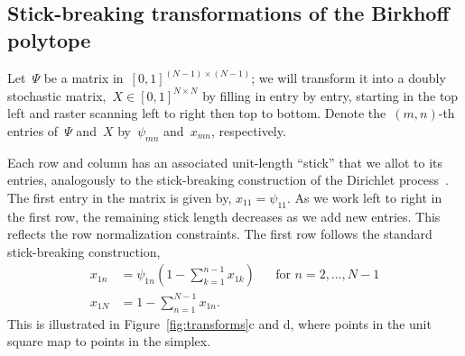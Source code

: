 \documentclass[twoside]{article}
\begin{document}
\subsection{Stick-breaking transformations of the Birkhoff polytope}
Let~$\Psi$ be a matrix in~${[0,1]^{(N-1) \times (N-1)}}$; we will
transform it into a doubly stochastic
matrix,~${X \in [0,1]^{N \times N}}$ by filling in entry by entry, starting
in the top left and raster scanning left to right then top to
bottom. Denote the~$(m,n)$-th entries of~$\Psi$ and~$X$ by~$\psi_{mn}$
and~${x}_{mn}$, respectively.

Each row and column has an associated unit-length ``stick'' that we
allot to its entries, analogously to the stick-breaking construction
of the Dirichlet process~\citep{sethuraman1994constructive}.  The
first entry in the matrix is given by, $x_{11} = \psi_{11}$.  As we
work left to right in the first row, the remaining stick length
decreases as we add new entries. This reflects the row normalization
constraints.  The first row follows the standard stick-breaking
construction,
\begin{align*}
  x_{1n} &= \psi_{1n} \left(1 - \sum_{k=1}^{n-1} x_{1k} \right)  & &  \text{for } n=2, \ldots, N-1\\
  x_{1N} &= 1 - \sum_{n=1}^{N-1} x_{1n}.
\end{align*}
This is illustrated in Figure~\ref{fig:transforms}c and d, where points
in the unit square map to points in the simplex. 
\end{document}
